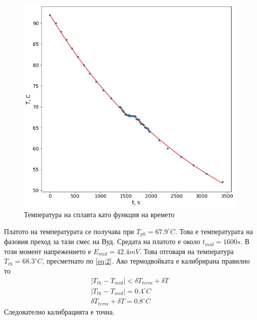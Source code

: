 \documentclass[%
 reprint,
 amsmath,amssymb,
 aps,
]{revtex4-2}
\begin{document}
\begin{figure}[H]
    \centering
    \caption{Температура на сплавта като функция на времето}
    \includegraphics[width=0.95\columnwidth, keepaspectratio=true]{cool3.png}
\end{figure}
Платото на температурата се получава при $T_{ph} = 67.9^{\circ}C$. Това е температурата на фазовия преход за тази смес на Вуд. Средата на платото е около $t_{mid}=1600s$. В този момент напрежението е $E_{mid} = 42.4 mV$. Това отговаря на температура $T_{th} = 68.3^{\circ} C$, пресметнато по \eqref{eq:2}. Ако термодвойката е калибрирана правилно то 
\begin{gather*}
    \vert T_{th} - T_{mid} \vert < \delta T_{term} + \delta T \\
    \vert T_{th} - T_{mid} \vert = 0.4^{\circ}C \\
    \delta T_{term} + \delta T = 0.8^{\circ}C 
\end{gather*}
Следователно калибрацията е точна. 
\end{document}
